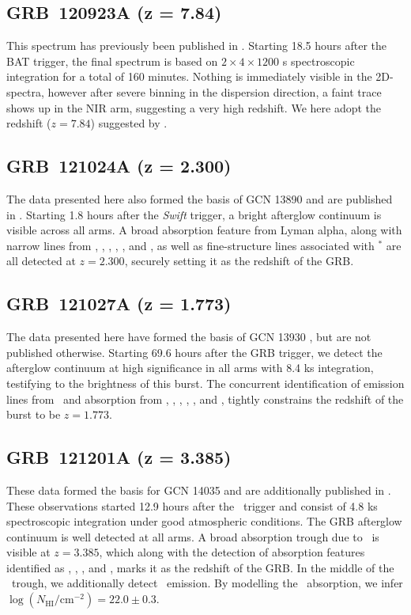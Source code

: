\documentclass[longauth]{aa}    %
\begin{document}
\subsection{GRB~120923A (z = 7.84)} \label{120923}

This spectrum has previously been published in \citet{Tanvir2018}. Starting
18.5 hours after the BAT trigger, the final spectrum is based on $2 \times 4
\times 1200$ s spectroscopic integration for a total of 160 minutes. Nothing is
immediately visible in the 2D-spectra, however after severe binning in the
dispersion direction, a faint trace shows up in the NIR arm, suggesting a very
high redshift. We here adopt the redshift ($z = 7.84$) suggested by
\citet{Tanvir2018}.

\subsection{GRB~121024A (z = 2.300)} \label{121024}

The data presented here also formed the basis of GCN 13890 \citep{GCN13890} and
are published in \citet{Friis2015}. Starting 1.8 hours after the
\textit{Swift} trigger, a bright afterglow continuum is visible across all arms.
A broad absorption feature from Lyman alpha, along with narrow lines from \civ,
\SIii, \SIiv, \feii, \sii, and \alii, as well as fine-structure lines associated
with \SIii$^*$ are all detected at $z = 2.300$, securely setting it as the
redshift of the GRB.

\subsection{GRB~121027A (z = 1.773)} \label{121027}

The data presented here have formed the basis of GCN 13930 \citep{GCN13930}, but
are not published otherwise. Starting 69.6 hours after the GRB trigger, we detect
the afterglow continuum at high significance in all arms with 8.4 ks
integration, testifying to the brightness of this burst. The concurrent
identification of emission lines from \oiii~and absorption from \civ, \alii,
\aliii, \mgi, \mgii, and \feii, tightly constrains the redshift of the burst to
be $z = 1.773$.

\subsection{GRB~121201A (z = 3.385)} \label{121201}

These data formed the basis for GCN 14035 \citep{GCN14035} and are additionally
published in \citet{Kruhler2015}. These observations started 12.9 hours after
the \swift~trigger and consist of 4.8 ks spectroscopic integration under good
atmospheric conditions. The GRB afterglow continuum is well detected at all
arms. A broad absorption trough due to \lya~is visible at $z = 3.385$, which
along with the detection of absorption features identified as \SIiv, \civ,
\alii, and \aliii, marks it as the redshift of the GRB. In the middle of the
\lya~trough, we additionally detect \lya~emission. By modelling the
\lya~absorption, we infer $\log (N_{\mathrm{HI}}/\mathrm{cm}^{-2}) = 22.0 \pm
0.3$.
\end{document}
